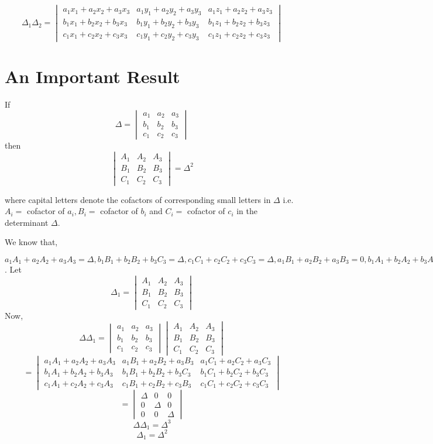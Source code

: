 $$\Delta_1\Delta_2 = \begin{vmatrix}a_1x_1 + a_2x_2 + a_3x_3 & a_1y_1 +
a_2y_2 + a_3y_3 & a_1z_1 + a_2z_2 + a_3z_3\\b_1x_1 + b_2x_2 + b_3x_3 & b_1y_1 +
b_2y_2 + b_3y_3 & b_1z_1 + b_2z_2 + b_3z_3 \\ c_1x_1 + c_2x_2 + c_3x_3 &
c_1y_1 + c_2y_2 + c_3y_3 & c_1z_1 + c_2z_2 + c_3z_3\end{vmatrix}$$

\section{An Important Result}
If $$\Delta = \begin{vmatrix}a_1 & a_2 & a_3\\b_1 & b_2 & b_3\\c_1 & c_2 & c_3\end{vmatrix}$$ then $$\begin{vmatrix}A_1 & A_2 &
    A_3\\B_1 & B_2 & B_3\\C_1 & C_2 & C_3\end{vmatrix} = \Delta^2$$

where capital letters denote the cofactors of corresponding small letters in $\Delta$ i.e. $A_i =$ cofactor of $a_i, B_i =$
cofactor of $b_i$ and $C_i =$ cofactor of $c_i$ in the determinant $\Delta$.

We know that,

$a_1A_1 + a_2A_2 + a_3A_3 = \Delta, b_1B_1 + b_2B_2 + b_3C_3 =
\Delta, c_1C_1 + c_2C_2 + c_3C_3 = \Delta, a_1B_1 + a_2B_2 +
a_3B_3 = 0, b_1A_1 + b_2A_2 + b_3A_3 = 0, a_1C_1 + a_2C_2 +
a_3C_3 = 0, c_1A_1 + c_2A_2 + c_3A_3 = 0, b_1C_1 + b_2C_2 +
b_3C_3 = 0, c_1B_1 + c_2B_2 + c_3B_3 = 0$.
Let $$\Delta_1 = \begin{vmatrix}A_1 & A_2 & A_3\\B_1 & B_2 &
B_3\\C_1 & C_2 & C_3\end{vmatrix}$$
Now, $$\Delta\Delta_1 = \begin{vmatrix}a_1 & a_2 & a_3\\b_1 & b_2 &
b_3\\c_1 & c_2 & c_3\end{vmatrix}\begin{vmatrix}A_1 & A_2 & A_3\\B_1 & B_2 &
B_3\\C_1 & C_2 & C_3\end{vmatrix}$$
$$= \begin{vmatrix}a_1A_1 + a_2A_2 + a_3A_3 & a_1B_1 + a_2B_2 + a_3B_3 &
a_1C_1 + a_2C_2 + a_3C_3\\b_1A_1 + b_2A_2 + b_3A_3 & b_1B_1 + b_2B_2 + b_3C_3 &
b_1C_1 + b_2C_2 + b_3C_3\\c_1A_1 + c_2A_2 + c_3A_3 & c_1B_1 + c_2B_2 + c_3B_3 &
c_1C_1 + c_2C_2 + c_3C_3\end{vmatrix}$$
$$= \begin{vmatrix}\Delta & 0 & 0\\0 & \Delta & 0\\0 & 0 &\Delta\end{vmatrix}$$
$$\Delta\Delta_1= \Delta^3$$
$$\Delta_1 = \Delta^2$$

